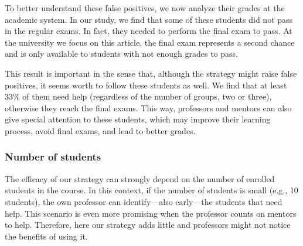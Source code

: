 To better understand these false positives, we now analyze their grades at the academic system. In our study, we find that some of these students did not pass in the regular exams. In fact, they needed to perform the final exam to pass. At the university we focus on this article, the final exam represents a second chance and is only available to students with not enough grades to pass.

This result is important in the sense that, although the strategy might raise false positives, it seems worth to follow these students as well. We find that at least 33\% of them need help (regardless of the number of groups, two or three), otherwise they reach the final exams. This way, professors and mentors can also give special attention to these students, which may improve their learning process, avoid final exams, and lead to better grades.






\subsubsection{Number of students}

The efficacy of our strategy can strongly depend on the number of enrolled students in the course. In this context, if the number of students is small (e.g., 10 students), the own professor can identify---also early---the students that need help. This scenario is even more promising when the professor counts on mentors to help. Therefore, here our strategy adds little and professors might not notice the benefits of using it.

